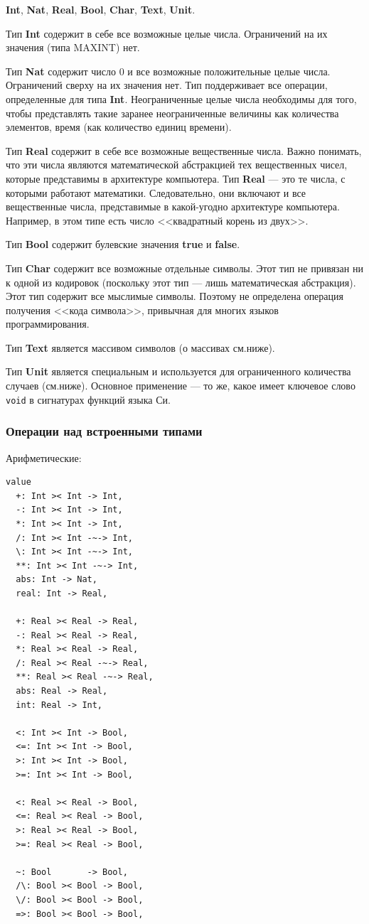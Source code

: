 \documentclass[14pt, twoside]{extreport}
\newcommand{\head}[1]{\vspace{1cm}\subsubsection*{#1}}
\begin{document}
\textbf{Int}, \textbf{Nat}, \textbf{Real}, \textbf{Bool}, \textbf{Char}, \textbf{Text}, \textbf{Unit}.

Тип \textbf{Int} содержит в себе все возможные целые числа. Ограничений на их значения (типа MAXINT) нет.

Тип \textbf{Nat} содержит число 0 и все возможные положительные целые числа. Ограничений сверху на их значения нет. Тип поддерживает все операции, определенные для типа \textbf{Int}. Неограниченные целые числа необходимы для того, чтобы представлять такие заранее неограниченные величины как количества элементов, время (как количество единиц времени).

Тип \textbf{Real} содержит в себе все возможные вещественные числа. Важно понимать, что эти числа являются математической абстракцией тех вещественных чисел, которые представимы в архитектуре компьютера. Тип \textbf{Real} --- это те числа, с которыми работают математики. Следовательно, они включают и все вещественные числа, представимые в какой-угодно архитектуре компьютера. Например, в этом типе есть число <<квадратный корень из двух>>.

Тип \textbf{Bool} содержит булевские значения \textbf{true} и \textbf{false}.

Тип \textbf{Char} содержит все возможные отдельные символы. Этот тип не привязан ни к одной из кодировок (поскольку этот тип --- лишь математическая абстракция). Этот тип содержит все мыслимые символы. Поэтому не определена операция получения <<кода символа>>, привычная для многих языков программирования.

Тип \textbf{Text} является массивом символов (о массивах см.ниже).

Тип \textbf{Unit} является специальным и используется для ограниченного количества случаев (см.ниже). Основное применение --- то же, какое имеет ключевое слово \texttt{void} в сигнатурах функций языка Си.

\head{Операции над встроенными типами}
Арифметические:
\begin{lstlisting}
value
  +: Int >< Int -> Int,
  -: Int >< Int -> Int,
  *: Int >< Int -> Int,
  /: Int >< Int -~-> Int,
  \: Int >< Int -~-> Int,
  **: Int >< Int -~-> Int,
  abs: Int -> Nat,
  real: Int -> Real,

  +: Real >< Real -> Real,
  -: Real >< Real -> Real,
  *: Real >< Real -> Real,
  /: Real >< Real -~-> Real,
  **: Real >< Real -~-> Real,
  abs: Real -> Real,
  int: Real -> Int,

  <: Int >< Int -> Bool,
  <=: Int >< Int -> Bool,
  >: Int >< Int -> Bool,
  >=: Int >< Int -> Bool,

  <: Real >< Real -> Bool,
  <=: Real >< Real -> Bool,
  >: Real >< Real -> Bool,
  >=: Real >< Real -> Bool,

  ~: Bool       -> Bool,
  /\: Bool >< Bool -> Bool,
  \/: Bool >< Bool -> Bool,
  =>: Bool >< Bool -> Bool,
\end{lstlisting}
\end{document}
